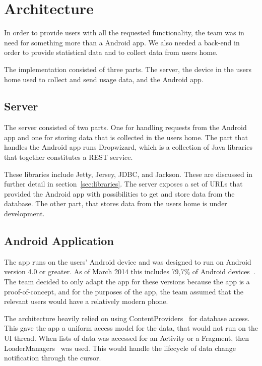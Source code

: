 \section{Architecture}
In order to provide users with all the requested functionality, the team was in need for something more than a Android app. We also needed a back-end in order to provide statistical data and to collect data from users home.

The implementation consisted of three parts. The server, the device in the users home used to collect and send usage data, and the Android app.

\subsection{Server}
The server consisted of two parts. One for handling requests from the Android app and one for storing data that is collected in the users home. 
The part that handles the Android app runs Dropwizard, which is a collection of Java libraries that together constitutes a REST service. 

These libraries include Jetty, Jersey, JDBC, and Jackson. These are discussed in further detail in section~\ref{sec:libraries}.
The server exposes a set of URLs that provided the Android app with 
possibilities to get and store data from the database. The other part, that stores data from the users home is under development.

\subsection{Android Application}
The app runs on the users' Android device and was designed to run on Android version 4.0 or greater. As of March 2014 this includes 79,7\% of Android devices~\cite{AndroidDeviceFragmentation}. The team decided to only adapt the app for these versions because the app is a proof-of-concept, and for the purposes of the app, the team assumed that the relevant users would have a relatively modern phone. 

The architecture heavily relied on using ContentProviders~\cite{contentproviders} for database access. This gave the app a uniform access model for the data, that would not run on the UI thread. When lists of data was accessed for an Activity or a Fragment, then LoaderManagers~\cite{loadermanager} was used. This would handle the lifecycle of data change notification through the cursor. 


